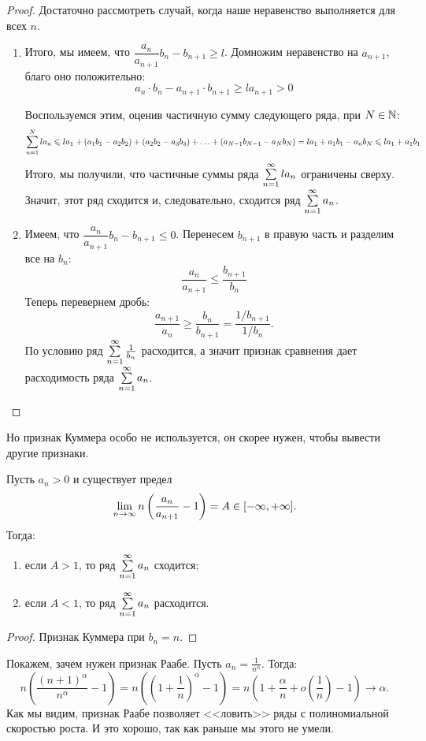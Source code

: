 \documentclass[a4paper, 12pt]{article}
\begin{document}
\begin{proof}
Достаточно рассмотреть случай, когда наше неравенство выполняется для всех $n$.
\begin{enumerate}
\item Итого, мы имеем, что $\dfrac{a_n}{a_{n+1}}b_n - b_{n+1} \geq l$. Домножим неравенство на $a_{n+1}$, благо оно положительно:
$$
a_n\cdot b_n - a_{n+1}\cdot b_{n+1} \geq la_{n+1} > 0
$$

Воспользуемся этим, оценив частичную сумму следующего ряда, при $N \in \mathbb{N}$:
$$
\sum\limits_{n=1}^{N} la_n \leqslant la_1 + (a_1b_1 - a_2b_2) + (a_2b_2 - a_3b_3) + \ldots + (a_{N-1}b_{N-1} - a_Nb_N)
= la_1 + a_1b_1 - a_nb_N \leqslant la_1 + a_1b_1
$$
Итого, мы получили, что частичные суммы ряда $\sum\limits_{n=1}^{\infty} la_n$ ограничены сверху. Значит, этот ряд сходится и, следовательно, сходится ряд $\sum\limits_{n=1}^{\infty}a_n$.

\item Имеем, что $\dfrac{a_n}{a_{n+1}}b_n - b_{n+1} \leq 0$. Перенесем $b_{n+1}$ в правую часть и разделим все на $b_n$:
$$
\frac{a_n}{a_{n+1}} \leq \frac{b_{n+1}}{b_n}
$$
Теперь перевернем дробь:
$$
\frac{a_{n+1}}{a_n} \geq \frac{b_n}{b_{n+1}} = \frac{1/ b_{n+1}}{1 / b_{n}}.
$$
По условию ряд $\sum\limits_{n=1}^{\infty}\frac{1}{b_n}$ расходится, а значит признак сравнения дает расходимость ряда $\sum\limits_{n=1}^{\infty}a_n$.
\end{enumerate}
\end{proof}

Но признак Куммера особо не используется, он скорее нужен, чтобы вывести другие признаки.
\begin{Test}
Пусть $a_n > 0$ и существует предел 
$$
\lim\limits_{n \rightarrow \infty} n \left( \dfrac{a_n}{a_{n+1}} - 1 \right) = A \in [-\infty, +\infty].
$$
Тогда:
\begin{enumerate}
\item если $A > 1$, то ряд $\sum\limits_{n=1}^{\infty}a_n$ сходится;
\item если $A < 1$, то ряд $\sum\limits_{n=1}^{\infty}a_n$ расходится.
\end{enumerate}
\end{Test}

\begin{proof}
Признак Куммера при $b_n = n$.
\end{proof}

Покажем, зачем нужен признак Раабе. Пусть $a_n = \frac{1}{n^\alpha}$. Тогда:
$$
n\left( \frac{(n+1)^\alpha}{n^{\alpha}} - 1 \right) = n\left( \left( 1 + \frac{1}{n} \right)^\alpha  - 1\right) = n\left( 1 + \frac{\alpha}{n} + o\left(\frac{1}{n}\right) - 1\right) \longrightarrow \alpha.
$$
Как мы видим, признак Раабе позволяет <<ловить>> ряды с полиномиальной скоростью роста. И это хорошо, так как раньше мы этого не умели.
\end{document}
